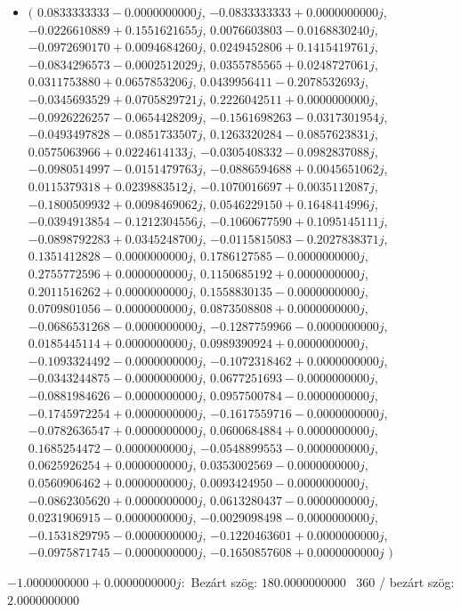 \documentclass[14pt,a4paper]{article}
\begin{document}
\begin{itemize}
\item
$\big($
$0.0833333333-0.0000000000j$, $-0.0833333333+0.0000000000j$, $-0.0226610889+0.1551621655j$, $0.0076603803-0.0168830240j$, $-0.0972690170+0.0094684260j$, $0.0249452806+0.1415419761j$, $-0.0834296573-0.0002512029j$, $0.0355785565+0.0248727061j$, $0.0311753880+0.0657853206j$, $0.0439956411-0.2078532693j$, $-0.0345693529+0.0705829721j$, $0.2226042511+0.0000000000j$, $-0.0926226257-0.0654428209j$, $-0.1561698263-0.0317301954j$, $-0.0493497828-0.0851733507j$, $0.1263320284-0.0857623831j$, $0.0575063966+0.0224614133j$, $-0.0305408332-0.0982837088j$, $-0.0980514997-0.0151479763j$, $-0.0886594688+0.0045651062j$, $0.0115379318+0.0239883512j$, $-0.1070016697+0.0035112087j$, $-0.1800509932+0.0098469062j$, $0.0546229150+0.1648414996j$, $-0.0394913854-0.1212304556j$, $-0.1060677590+0.1095145111j$, $-0.0898792283+0.0345248700j$, $-0.0115815083-0.2027838371j$, $0.1351412828-0.0000000000j$, $0.1786127585-0.0000000000j$, $0.2755772596+0.0000000000j$, $0.1150685192+0.0000000000j$, $0.2011516262+0.0000000000j$, $0.1558830135-0.0000000000j$, $0.0709801056-0.0000000000j$, $0.0873508808+0.0000000000j$, $-0.0686531268-0.0000000000j$, $-0.1287759966-0.0000000000j$, $0.0185445114+0.0000000000j$, $0.0989390924+0.0000000000j$, $-0.1093324492-0.0000000000j$, $-0.1072318462+0.0000000000j$, $-0.0343244875-0.0000000000j$, $0.0677251693-0.0000000000j$, $-0.0881984626-0.0000000000j$, $0.0957500784-0.0000000000j$, $-0.1745972254+0.0000000000j$, $-0.1617559716-0.0000000000j$, $-0.0782636547+0.0000000000j$, $0.0600684884+0.0000000000j$, $0.1685254472-0.0000000000j$, $-0.0548899553-0.0000000000j$, $0.0625926254+0.0000000000j$, $0.0353002569-0.0000000000j$, $0.0560906462+0.0000000000j$, $0.0093424950-0.0000000000j$, $-0.0862305620+0.0000000000j$, $0.0613280437-0.0000000000j$, $0.0231906915-0.0000000000j$, $-0.0029098498-0.0000000000j$, $-0.1531829795-0.0000000000j$, $-0.1220463601+0.0000000000j$, $-0.0975871745-0.0000000000j$, $-0.1650857608+0.0000000000j$
$\big)$
\end{itemize}
$-1.0000000000+0.0000000000j$:\
Bezárt szög: $180.0000000000$ \
360 / bezárt szög: $2.0000000000$\
\end{document}
